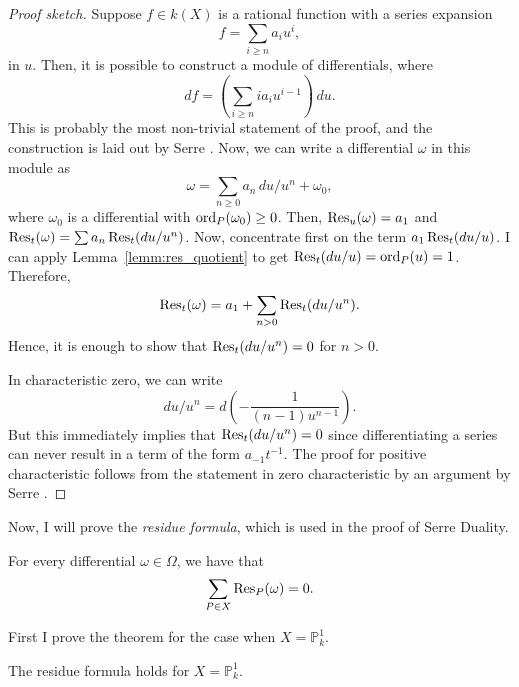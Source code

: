 \begin{proof}[Proof sketch]
  Suppose $f\in k(X)$ is a rational function with a series expansion
  \[
    f=\sum_{i\geq n}a_{i}u^{i},
  \]
  in $u$. Then, it is possible to construct a module of differentials, where
  \[
    df=\left(\sum_{i\geq n}ia_{i}u^{i-1}\right)\,du.
  \]
  This is probably the most non-trivial statement of the proof, and the
  construction is laid out by Serre \cite{serre}. Now, we can write a
  differential $\omega$ in this module as
  \[
    \omega = \sum_{n\geq 0}a_{n}\,du/u^{n}+\omega_{0},
  \]
  where $\omega_{0}$ is a differential with $\operatorname{ord}_{P}(\omega_{0})\geq 0$.
  Then, $\operatorname{Res}_{u}(\omega)=a_{1}$ and $\operatorname{Res}_{t}(\omega)=
  \sum a_{n}\operatorname{Res}_{t}(du/u^{n})$. Now, concentrate first on the term
  $a_{1}\operatorname{Res}_{t}(du/u)$. I can apply Lemma~\ref{lemm:res_quotient}
  to get $\operatorname{Res}_{t}(du/u)=\operatorname{ord}_{P}(u)=1$. Therefore,
  \[
    \operatorname{Res}_{t}(\omega) = a_{1}+\sum_{n>0}\operatorname{Res}_{t}(du/u^{n}).
  \]
  Hence, it is enough to show that $\operatorname{Res}_{t}(du/u^{n})=0$ for $n>0$.

  In characteristic zero, we can write
  \[
    du/u^{n}=d\left(-\frac1{(n-1)u^{n-1}}\right).
  \]
  But this immediately implies that $\operatorname{Res}_{t}(du/u^{n})=0$ since
  differentiating a series can never result in a term of the form
  $a_{-1}t^{-1}$. The proof for positive characteristic follows from the
  statement in zero characteristic by an argument by Serre \cite{serre}.
\end{proof}
Now, I will prove the \emph{residue formula}, which is used in the proof
of Serre Duality.
\begin{thm}\label{thm:residue_theorem}
  For every differential $\omega\in\Omega$, we have that
  \[
    \sum_{P\in X}\operatorname{Res}_{P}(\omega)=0.
  \]
\end{thm}
First I prove the theorem for the case when $X=\mathbb{P}^{1}_{k}$.
\begin{lemm}
  The residue formula holds for $X=\mathbb{P}^{1}_{k}$.
\end{lemm}

